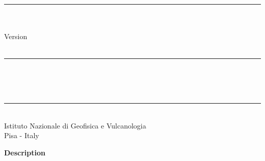 
\thispagestyle{empty}

\vspace*{0.3in}

\begin{centering}
  \rule{6in}{0.04in}				\\	\vspace{0.25in}
  {\Huge \PDAC\ \RMTITLE}			\\	\vspace{0.25in}
  {\Large Version \PDACVERSION}			\\	\vspace{0.20in}
  {\Large \PDACNOTES}			        \\	\vspace{0.20in}
  \rule{6in}{0.04in}				\\	\vspace{0.25in}
  {\Large \RMAUTHORS}				\\	\vspace{0.20in}
  \PDACDATE					\\	\vspace{0.20in}
  \rule{6in}{0.04in}				\\	\vspace{0.25in}
  {\large       Istituto Nazionale di Geofisica e Vulcanologia} \\ 
  {\large       Pisa - Italy}      \\ 
\end{centering}
\vspace{0.2in}

\begin{center}
  {\Large \bf Description}
\end{center}

\noindent \RMDESC

